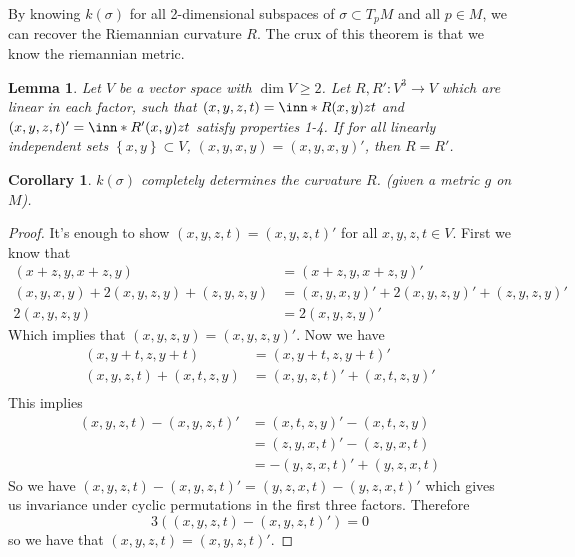 \documentclass[a4paper]{article}
\newtheorem*{cor}{Corollary}
\newtheorem*{lem}{Lemma}
\begin{document}
By knowing $k(\sigma)$ for all 2-dimensional subspaces of $\sigma \subset T_pM$ and all $p \in M$, we can recover the Riemannian curvature $R$. The crux of this theorem is that we know the riemannian metric.

\begin{lem}
  Let $V$ be a vector space with $\dim V \geq 2$. Let $R, R' : V^3 \rightarrow V$ which are linear in each factor, such that $(x,y,z,t) = \inn*{R(x,y)z}{t}$ and $(x,y,z,t)' = \inn*{R'(x,y)z}{t}$ satisfy properties 1-4. If for all linearly independent sets $\left\{ x,y \right\} \subset V$, $(x,y,x,y) = (x,y,x,y)'$, then $R = R'$.
\end{lem}

\begin{cor}
  $k(\sigma)$ completely determines the curvature $R$. (given a metric $g$ on $M$).
\end{cor}

\begin{proof}
  It's enough to show $(x,y,z,t) = (x,y,z,t)'$ for all $x,y,z,t \in V$. First we know that 
  \[
    \begin{aligned}
      (x+z,y, x+z,y) &= (x+z,y,x+z,y)' \\
      (x,y,x,y) + 2(x,y,z,y) + (z,y,z,y) &=(x,y,x,y)' + 2(x,y,z,y)' + (z,y,z,y)' \\
      2(x,y,z,y) &= 2(x,y,z,y)'
    \end{aligned}
  \]
  Which implies that $(x,y,z,y) = (x,y,z,y)'$. Now we have
  \[
    \begin{aligned}
      (x,y+t,z,y+t) &= (x,y+t, z, y+t)' \\
      (x,y,z,t) + (x,t,z,y) &= (x,y,z,t)' + (x,t,z,y)' \\
    \end{aligned}
  \]
  This implies 
  \[
    \begin{aligned}
      (x,y,z,t) - (x,y,z,t)'  &= (x,t,z,y)' - (x,t,z,y) \\
                              &= (z,y,x,t)' - (z,y,x,t) \\
                              &= -(y,z,x,t)' + (y,z,x,t)
    \end{aligned}
  \]
  So we have $(x,y,z,t) - (x,y,z,t)' = (y,z,x,t) - (y,z,x,t)'$ which gives us invariance under cyclic permutations in the first three factors. Therefore 
  \[
    3 \left( (x,y,z,t) - (x,y,z,t)' \right) = 0
  \]
  so we have that $(x,y,z,t) = (x,y,z,t)'$.
\end{proof}
\end{document}
